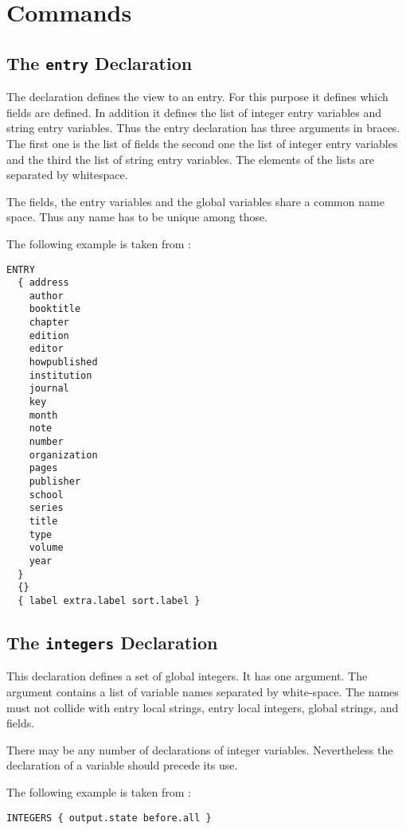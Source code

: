 \section{Commands}

\subsection{The \texttt{entry} Declaration}%
%
\label{sec:entry}

The declaration defines the view to an entry. For this purpose it
defines which fields are defined. In addition it defines the list of
integer entry variables and string entry variables. Thus the entry
declaration has three arguments in braces. The first one is the list
of fields the second one the list of integer entry variables and the
third the list of string entry variables. The elements of the lists
are separated by whitespace.

The fields, the entry variables and the global variables share a
common name space. Thus any name has to be unique among those.

The following example is taken from :

\begin{lstlisting}[language=bst]
  ENTRY
  { address
    author
    booktitle
    chapter
    edition
    editor
    howpublished
    institution
    journal
    key
    month
    note
    number
    organization
    pages
    publisher
    school
    series
    title
    type
    volume
    year
  }
  {}
  { label extra.label sort.label }
\end{lstlisting}


\subsection{The \texttt{integers} Declaration}%
%
\label{sec:integers}

This declaration defines a set of global integers. It has one
argument. The argument contains a list of variable names separated by
white-space. The names must not collide with entry local strings,
entry local integers, global strings, and fields.

There may be any number of declarations of integer variables.
Nevertheless the declaration of a variable should precede its use.

The following example is taken from :

\begin{lstlisting}[language=bst]
  INTEGERS { output.state before.all }
\end{lstlisting}


